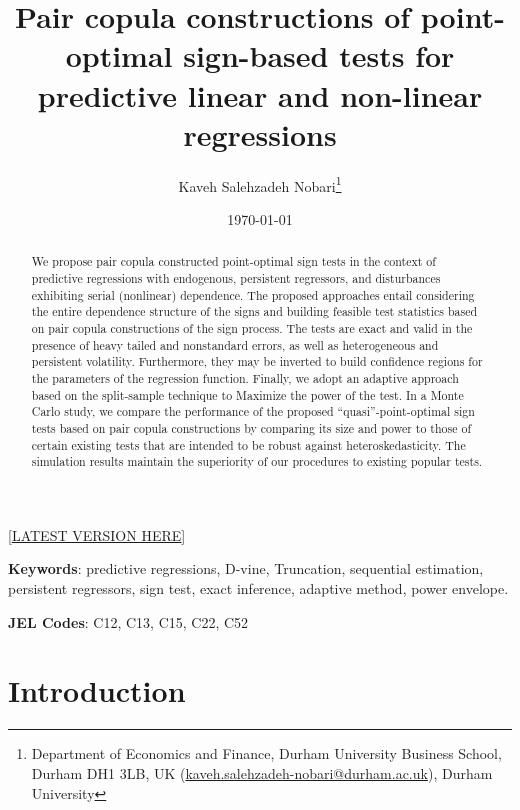 \documentclass[harvard,11pt]{article}
\begin{document}
\title{{Pair copula constructions of point-optimal sign-based tests for predictive linear and non-linear regressions}}
\author{Kaveh Salehzadeh Nobari\thanks{%
Department of Economics and Finance, Durham University Business School, Durham DH1 3LB, UK
(\href{emailto: kaveh.salehzadeh-nobari@durham.ac.uk}{kaveh.salehzadeh-nobari@durham.ac.uk}), 
Durham University	}}
\date{\today}
\maketitle
\begin{center}
[\href{https://kavehsn.github.io/Job-Market-Paper/PCC_POS_2020.pdf}{\underline{LATEST VERSION HERE}}]
\end{center}


\begin{abstract}
We propose pair copula constructed point-optimal sign tests in the context of predictive regressions with endogenous, persistent regressors, and disturbances exhibiting serial (nonlinear) dependence. The proposed approaches entail considering the entire dependence structure of the signs and building feasible test statistics based on pair copula constructions of the sign process. The tests are exact and valid in the presence of heavy tailed and nonstandard errors, as well as heterogeneous and persistent volatility. Furthermore, they may be inverted to build confidence regions for the parameters of the regression function. Finally, we adopt an adaptive approach based on the split-sample technique to Maximize the power of the test. In a Monte Carlo study, we compare the performance of the proposed \textquotedblleft quasi\textquotedblright-point-optimal sign tests based on pair copula constructions by comparing its size and power to those of certain existing tests that are intended to be robust against heteroskedasticity. The simulation results maintain the superiority of our procedures to existing popular tests.   
\end{abstract}


\noindent \textbf{Keywords}: predictive regressions, D-vine, Truncation, sequential estimation, persistent regressors, sign test, exact inference, adaptive method, power envelope.

\noindent \textbf{JEL Codes}: C12, C13, C15, C22, C52

\newpage
\section{Introduction \label{Introduction}}
\end{document}
